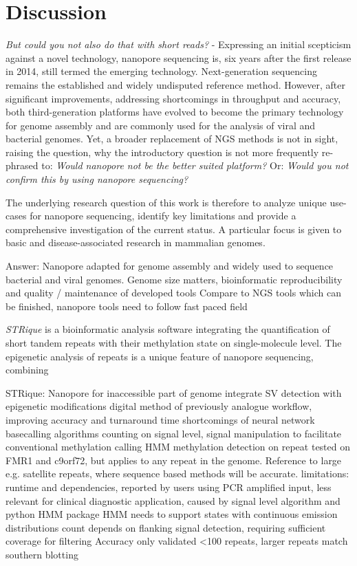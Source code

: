 \chapter{Discussion}
\label{cha:summary}

\textit{But could you not also do that with short reads?} - Expressing an initial scepticism against a novel technology, nanopore sequencing is, six years after the first release in 2014, still termed the emerging technology.
Next-generation sequencing remains the established and widely undisputed reference method.
However, after significant improvements, addressing shortcomings in throughput and accuracy, both third-generation platforms have evolved to become the primary technology for genome assembly and are commonly used for the analysis of viral and bacterial genomes.
Yet, a broader replacement of NGS methods is not in sight, raising the question, why the introductory question is not more frequently re-phrased to: \textit{Would nanopore not be the better suited platform?} Or: \textit{Would you not confirm this by using nanopore sequencing?}

The underlying research question of this work is therefore to analyze unique use-cases for nanopore sequencing, identify key limitations and provide a comprehensive investigation of the current status.
A particular focus is given to basic and disease-associated research in mammalian genomes.

Answer: Nanopore adapted for genome assembly and widely used to sequence bacterial and viral genomes.
Genome size matters, bioinformatic reproducibility and quality / maintenance of developed tools
Compare to NGS tools which can be finished, nanopore tools need to follow fast paced field

\textit{STRique} is a bioinformatic analysis software integrating the quantification of short tandem repeats with their methylation state on single-molecule level.
The epigenetic analysis of repeats is a unique feature of nanopore sequencing, combining 


STRique: Nanopore for inaccessible part of genome
integrate SV detection with epigenetic modifications
digital method of previously analogue workflow, improving accuracy and turnaround time
shortcomings of neural network basecalling algorithms
counting on signal level, signal manipulation to facilitate conventional methylation calling
HMM methylation detection on repeat
tested on FMR1 and c9orf72, but applies to any repeat in the genome.
Reference to large e.g. satellite repeats, where sequence based methods will be accurate.
limitations: runtime and dependencies, reported by users using PCR amplified input, less relevant for clinical diagnostic application, caused by signal level algorithm and python HMM package
HMM needs to support states with continuous emission distributions 
count depends on flanking signal detection, requiring sufficient coverage for filtering
Accuracy only validated <100 repeats, larger repeats match southern blotting

